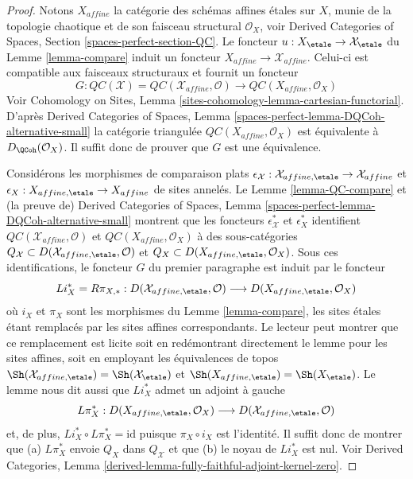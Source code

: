 \begin{proof}
Notons $X_{affine}$ la catégorie des schémas affines étales sur $X$,
munie de la topologie chaotique et de son faisceau structural $\mathcal{O}_X$, voir
Derived Categories of Spaces, Section \ref{spaces-perfect-section-QC}.
Le foncteur $u : X_\etale \to \mathcal{X}_\etale$ du Lemme \ref{lemma-compare}
induit un foncteur $X_{affine} \to \mathcal{X}_{affine}$.
Celui-ci est compatible aux faisceaux structuraux et fournit un foncteur
$$
G :
\mathit{QC}(\mathcal{X}) = \mathit{QC}(\mathcal{X}_{affine}, \mathcal{O})
\longrightarrow
\mathit{QC}(X_{affine}, \mathcal{O}_X)
$$
Voir
Cohomology on Sites, Lemma \ref{sites-cohomology-lemma-cartesian-functorial}.
D'après Derived Categories of Spaces, Lemma
\ref{spaces-perfect-lemma-DQCoh-alternative-small}
la catégorie triangulée $\mathit{QC}(X_{affine}, \mathcal{O}_X)$
est équivalente à $D_\QCoh(\mathcal{O}_X)$. Il suffit donc de
prouver que $G$ est une équivalence.

\medskip\noindent
Considérons les morphismes de comparaison plats
$\epsilon_\mathcal{X} : \mathcal{X}_{affine, \etale} \to \mathcal{X}_{affine}$
et $\epsilon_X : X_{affine, \etale} \to X_{affine}$
de sites annelés. Le Lemme \ref{lemma-QC-compare} et
(la preuve de) Derived Categories of Spaces, Lemma
\ref{spaces-perfect-lemma-DQCoh-alternative-small}
montrent que les foncteurs
$\epsilon_\mathcal{X}^*$ et $\epsilon_X^*$
identifient $\mathit{QC}(\mathcal{X}_{affine}, \mathcal{O})$
et $\mathit{QC}(X_{affine}, \mathcal{O}_X)$
à des sous-catégories
$Q_\mathcal{X} \subset D(\mathcal{X}_{affine, \etale}, \mathcal{O})$
et
$Q_X \subset D(X_{affine, \etale}, \mathcal{O}_X)$.
Sous ces identifications,
le foncteur $G$ du premier paragraphe est induit par le foncteur
$$
Li_X^* = R\pi_{X, *}:
D(\mathcal{X}_{affine, \etale}, \mathcal{O})
\longrightarrow
D(X_{affine, \etale}, \mathcal{O}_X)
$$
où $i_X$ et $\pi_X$ sont les morphismes du Lemme \ref{lemma-compare},
les sites étales étant remplacés par les sites affines correspondants.
Le lecteur peut montrer que ce remplacement est licite soit
en redémontrant directement le lemme pour les sites affines, soit
en employant les équivalences de topos
$\Sh(\mathcal{X}_{affine, \etale}) = \Sh(\mathcal{X}_\etale)$ et
$\Sh(X_{affine, \etale}) = \Sh(X_\etale)$.
Le lemme nous dit aussi que $Li_X^*$ admet un adjoint à gauche
$$
L\pi_X^*:
D(X_{affine, \etale}, \mathcal{O}_X)
\longrightarrow
D(\mathcal{X}_{affine, \etale}, \mathcal{O})
$$
et, de plus, $Li_X^* \circ L\pi_X^* = \text{id}$
puisque $\pi_X \circ i_X$ est l'identité. Il suffit donc
de montrer que (a) $L\pi_X^*$ envoie $Q_X$ dans $Q_\mathcal{X}$
et que (b) le noyau de $Li_X^*$ est nul.
Voir Derived Categories, Lemma
\ref{derived-lemma-fully-faithful-adjoint-kernel-zero}.


\end{proof}
